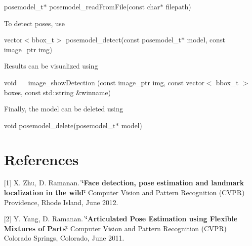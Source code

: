 posemodel\-\_\-t$\ast$ posemodel\-\_\-read\-From\-File(const char$\ast$ filepath)

 To detect poses, use 

 vector$<$bbox\-\_\-t$>$ posemodel\-\_\-detect(const posemodel\-\_\-t$\ast$ model, const image\-\_\-ptr img)

 Results can be visualized using 

 void ~ ~image\-\_\-show\-Detection (const image\-\_\-ptr img, const vector$<$ bbox\-\_\-t $>$ boxes, const std\-:\-:string \&winname)

 Finally, the model can be deleted using 

 void posemodel\-\_\-delete(posemodel\-\_\-t$\ast$ model)\section*{References}

 

\mbox{[}1\mbox{]} X. Zhu, D. Ramanan. {\bfseries \char`\"{}\-Face detection, pose estimation and landmark localization in the wild\char`\"{}} Computer Vision and Pattern Recognition (C\-V\-P\-R) Providence, Rhode Island, June 2012. \par
 \mbox{[}2\mbox{]} Y. Yang, D. Ramanan. {\bfseries \char`\"{}\-Articulated Pose Estimation using Flexible Mixtures of Parts\char`\"{}} Computer Vision and Pattern Recognition (C\-V\-P\-R) Colorado Springs, Colorado, June 2011. \par
 

  